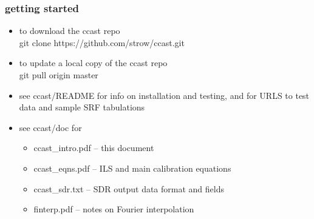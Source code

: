 \documentclass[11pt]{beamer}
\begin{document}
\begin{frame}
\frametitle{getting started}

\begin{itemize} 
   \item to download the ccast repo \\ 
     \hspace{10pt} git clone https://github.com/strow/ccast.git
   \item to update a local copy of the ccast repo \\ 
     \hspace{10pt} git pull origin master
   \item see ccast/README for info on installation and testing, and
     for URLS to test data and sample SRF tabulations
   \item see ccast/doc for
     \begin{itemize}
       \item ccast\_intro.pdf -- this document
       \item ccast\_eqns.pdf -- ILS and main calibration equations
       \item ccast\_sdr.txt -- SDR output data format and fields
       \item finterp.pdf -- notes on Fourier interpolation
     \end{itemize} 
\end{itemize} 

\end{frame}
\end{document}
